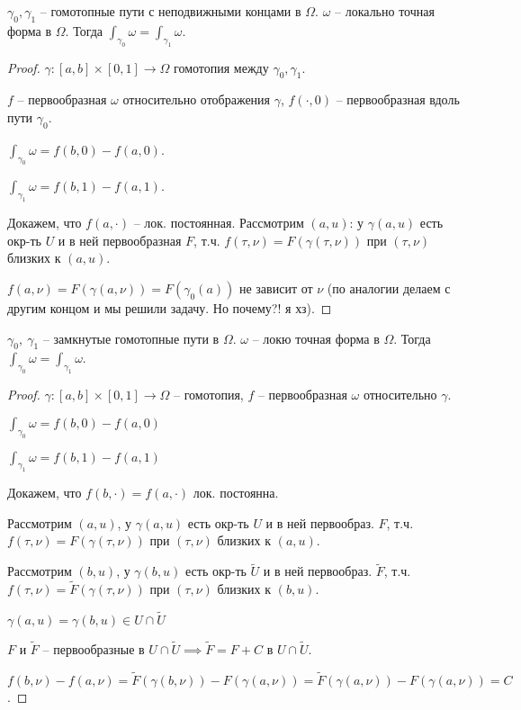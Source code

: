 \begin{theorem}
    $\gamma_0, \gamma_1$ -- гомотопные пути с неподвижными концами в $\Omega$. $\omega$ -- локально точная форма в $\Omega$. Тогда $\int_{\gamma_0} {\omega} = \int_{\gamma_1} {\omega}$.
\end{theorem}
\begin{proof}
    $\gamma: [a, b] \times [0, 1] \rightarrow \Omega$ гомотопия между $\gamma_0, \gamma_1$.
    
    $f$ -- первообразная $\omega$ относительно отображения $\gamma$, $f(\cdot, 0)$ -- первообразная вдоль пути $\gamma_0$.

    $\int_{\gamma_0} {\omega} = f(b, 0) - f(a, 0)$.

    $\int_{\gamma_1} {\omega} = f(b, 1) - f(a, 1)$.
    
    Докажем, что $f(a, \cdot)$ -- лок. постоянная. Рассмотрим $(a, u)$: у $\gamma(a, u)$ есть окр-ть $U$ и в ней первообразная $F$, т.ч. $f(\tau, \nu) = F(\gamma(\tau, \nu))$ при $(\tau, \nu)$ близких к $(a, u)$.

    $f(a, \nu) = F(\gamma(a, \nu)) = F(\gamma_0(a))$ не зависит от $\nu$ (по аналогии делаем с другим концом и мы решили задачу. Но почему?! я хз).
\end{proof}

\begin{theorem}
    $\gamma_0, \ \gamma_1$ -- замкнутые гомотопные пути в $\Omega$. $\omega$ -- локю точная форма в $\Omega$. Тогда $\int_{\gamma_0} { \omega } = \int_{\gamma_1} { \omega }$.
\end{theorem}
\begin{proof}
    $\gamma: [a, b] \times [0, 1] \rightarrow \Omega$ -- гомотопия, $f$ -- первообразная $\omega$ относительно $\gamma$.

    $\int_{\gamma_0} { \omega } = f(b, 0) - f(a, 0)$
    
    $\int_{\gamma_1} { \omega } = f(b, 1) - f(a, 1)$

    Докажем, что $f(b, \cdot) = f(a, \cdot)$ лок. постоянна.
    
    Рассмотрим $(a, u)$, у $\gamma(a, u)$ есть окр-ть $U$ и в ней первообраз. $F$, т.ч. $f(\tau, \nu) = F(\gamma(\tau, \nu))$ при $(\tau, \nu)$ близких к $(a, u)$.

    Рассмотрим $(b, u)$, у $\gamma(b, u)$ есть окр-ть $\tilde{U}$ и в ней первообраз. $\tilde{F}$, т.ч. $f(\tau, \nu) = \tilde{F}(\gamma(\tau, \nu))$ при $(\tau, \nu)$ близких к $(b, u)$.

    $\gamma(a, u) = \gamma(b, u) \in U \cap \tilde{U}$

    $F$ и $\tilde{F}$ -- первообразные в $U \cap \tilde{U} \implies \tilde{F} = F + C$ в $U \cap \tilde{U}$.

    $f(b, \nu) - f(a, \nu) = \tilde{F}(\gamma(b, \nu)) - F(\gamma(a, \nu)) = \tilde{F}(\gamma(a, \nu)) - F(\gamma(a, \nu)) = C$.
\end{proof}

